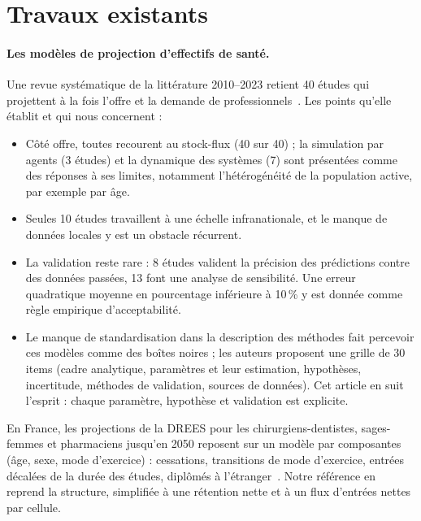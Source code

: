 \documentclass[11pt]{article}
\begin{document}
\section{Travaux existants}
\paragraph{Les modèles de projection d'effectifs de santé.} Une revue systématique de la littérature
2010--2023 retient 40 études qui projettent à la fois l'offre et la demande de
professionnels~\cite{lee2024hrh}. Les points qu'elle établit et qui nous concernent :
\begin{itemize}
  \item Côté offre, toutes recourent au stock-flux (40 sur 40) ; la simulation par agents (3 études) et
        la dynamique des systèmes (7) sont présentées comme des réponses à ses limites, notamment
        l'hétérogénéité de la population active, par exemple par âge.
  \item Seules 10 études travaillent à une échelle infranationale, et le manque de données locales y
        est un obstacle récurrent.
  \item La validation reste rare : 8 études valident la précision des prédictions contre des données
        passées, 13 font une analyse de sensibilité. Une erreur quadratique moyenne en pourcentage
        inférieure à 10\,\% y est donnée comme règle empirique d'acceptabilité.
  \item Le manque de standardisation dans la description des méthodes fait percevoir ces modèles
        comme des boîtes noires ; les auteurs proposent une grille de 30 items (cadre analytique,
        paramètres et leur estimation, hypothèses, incertitude, méthodes de validation, sources de
        données). Cet article en suit l'esprit : chaque paramètre, hypothèse et validation est
        explicite.
\end{itemize}
En France, les projections de la DREES pour les chirurgiens-dentistes, sages-femmes et pharmaciens
jusqu'en 2050 reposent sur un modèle par composantes (âge, sexe, mode d'exercice) : cessations,
transitions de mode d'exercice, entrées décalées de la durée des études, diplômés à
l'étranger~\cite{drees2021dd76}. Notre référence en reprend la structure, simplifiée à une rétention
nette et à un flux d'entrées nettes par cellule.
\end{document}
